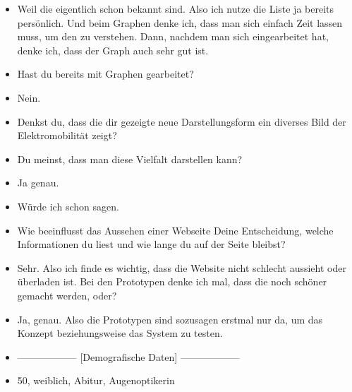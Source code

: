 {\begin{itemize}[]
            \item {} Weil die eigentlich schon bekannt sind.
                  Also ich nutze die Liste ja bereits persönlich.
                  Und beim Graphen denke ich, dass man sich einfach Zeit lassen muss, um den zu verstehen.
                  Dann, nachdem man sich eingearbeitet hat, denke ich, dass der Graph auch sehr gut ist.
            \item {} Hast du bereits mit Graphen gearbeitet?
            \item {} Nein.
            \item {} Denkst du, dass die dir gezeigte neue Darstellungsform ein diverses Bild der Elektromobilität zeigt?
            \item {} Du meinst, dass man diese Vielfalt darstellen kann?
            \item {} Ja genau.
            \item {} Würde ich schon sagen.
            \item {} Wie beeinflusst das Aussehen einer Webseite Deine Entscheidung, welche Informationen du liest und wie lange du auf der Seite bleibst?
            \item {} Sehr.
                  Also ich finde es wichtig, dass die Website nicht schlecht aussieht oder überladen ist.
                  Bei den Prototypen denke ich mal, dass die noch schöner gemacht werden, oder?
            \item {} Ja, genau. Also die Prototypen sind sozusagen erstmal nur da, um das Konzept beziehungsweise das System zu testen.
            \item {------------------} [Demografische Daten] {------------------}
            \item {} 50, weiblich, Abitur, Augenoptikerin
      \end{itemize}}
\nolinenumbers
